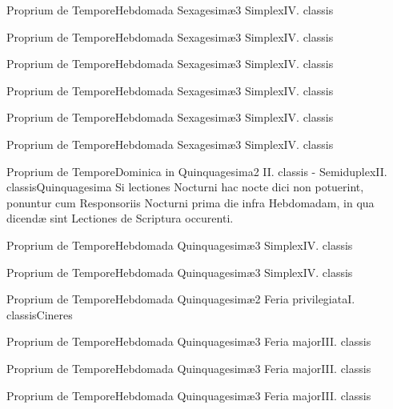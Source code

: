 \documentclass[liber-responsorialis.tex]{subfiles}
\begin{document}
	{Proprium de Tempore}{Hebdomada Sexagesimæ}{3}{}
	{Simplex}{IV. classis}{}
	{}
	{}

	{Proprium de Tempore}{Hebdomada Sexagesimæ}{3}{}
	{Simplex}{IV. classis}{}
	{}
	{}

	{Proprium de Tempore}{Hebdomada Sexagesimæ}{3}{}
	{Simplex}{IV. classis}{}
	{}
	{}

	{Proprium de Tempore}{Hebdomada Sexagesimæ}{3}{}
	{Simplex}{IV. classis}{}
	{}
	{}

	{Proprium de Tempore}{Hebdomada Sexagesimæ}{3}{}
	{Simplex}{IV. classis}{}
	{}
	{}

	{Proprium de Tempore}{Hebdomada Sexagesimæ}{3}{}
	{Simplex}{IV. classis}{}
	{}
	{}

	{Proprium de Tempore}{Dominica in Quinquagesima}{2}{}
	{II. classis - Semiduplex}{II. classis}{Quinquagesima}
	{Si lectiones  Nocturni hac nocte dici non potuerint, ponuntur cum Responsoriis  Nocturni prima die infra Hebdomadam, in qua dicendæ sint Lectiones de Scriptura occurenti.}
	{}

	{Proprium de Tempore}{Hebdomada Quinquagesimæ}{3}{}
	{Simplex}{IV. classis}{}
	{}
	{}

	{Proprium de Tempore}{Hebdomada Quinquagesimæ}{3}{}
	{Simplex}{IV. classis}{}
	{}
	{}

	{Proprium de Tempore}{Hebdomada Quinquagesimæ}{2}{}
	{Feria privilegiata}{I. classis}{Cineres}
	{}
	{}

	{Proprium de Tempore}{Hebdomada Quinquagesimæ}{3}{}
	{Feria major}{III. classis}{}
	{}
	{}

	{Proprium de Tempore}{Hebdomada Quinquagesimæ}{3}{}
	{Feria major}{III. classis}{}
	{}
	{}

	{Proprium de Tempore}{Hebdomada Quinquagesimæ}{3}{}
	{Feria major}{III. classis}{}
	{}
	{}
\end{document}
